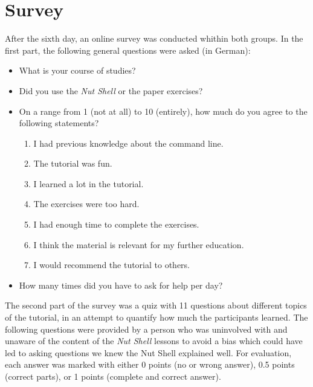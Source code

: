 \documentclass[paper=a4,twoside,abstract=on,cleardoublepage=empty,numbers=noenddot,toc=bib,12pt]{scrreprt}
\begin{document}
\section{Survey}

After the sixth day, an online survey was conducted whithin both groups. In the first part, the following general questions were asked (in German):

\begin{itemize}
    \item What is your course of studies?
    \item Did you use the \emph{Nut Shell} or the paper exercises?
    \item On a range from 1 (not at all) to 10 (entirely), how much do you agree to the following statements?
        \begin{enumerate}
            \item I had previous knowledge about the command line.
            \item The tutorial was fun.
            \item I learned a lot in the tutorial.
            \item The exercises were too hard.
            \item I had enough time to complete the exercises.
            \item I think the material is relevant for my further education.
            \item I would recommend the tutorial to others.
        \end{enumerate}
    \item How many times did you have to ask for help per day?
\end{itemize}

The second part of the survey was a quiz with 11 questions about different topics of the tutorial, in an attempt to quantify how much the participants learned. The following questions were provided by a person who was uninvolved with and unaware of the content of the \emph{Nut Shell} lessons to avoid a bias which could have led to asking questions we knew the Nut Shell explained well. For evaluation, each answer was marked with either 0 points (no or wrong answer), 0.5 points (correct parts), or 1 points (complete and correct answer).
\end{document}

